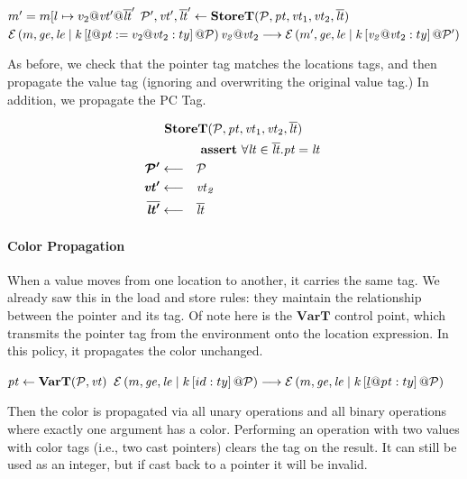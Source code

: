 \documentclass{article}
\begin{document}
                  {\(\mem' = \mem[l \mapsto v_2@\vt' @\overline{\lt}'\)}
                  {\(\trule{\PCT',\vt',\overline{\lt}'}{\storet{\PCT}{\pt}{\vt_1}{\vt_2}{\overline{\lt}}}\)}
                  {\(\defestate
                    {\assign{\loc{l}{\pt}}{v_2@\vt_2}}{ty}{\val{v_2}{\vt_2}}
                    \longrightarrow
                    \estate{\PCT'}{\mem'}{\genv}{\lenv}
                           {\val{v_2}{\vt_2}}{ty}{\cont}\)}

As before, we check that the pointer tag matches the locations tags, and then propagate the
value tag (ignoring and overwriting the original value tag.) In addition, we propagate the PC Tag.
                  
\[\begin{aligned}
\truledef{\storet{\PCT}{\pt}{\vt_1}{\vt_2}{\overline{\lt}}}
\assert{\forall \lt \in \overline{\lt} . \pt = \lt}
\settag{\PCT'}{\PCT}
\settag{\vt'}{\vt_2}
\settag{\overline{\lt'}}{\overline{\lt}}
\end{aligned}\]

\paragraph*{Color Propagation}

When a value moves from one location to another, it carries the same tag.
We already saw this in the load and store rules: they maintain the relationship
between the pointer and its tag. Of note here is the \(\mathbf{VarT}\) control point,
which transmits the pointer tag from the environment onto the location expression.
In this policy, it propagates the color unchanged.

            {\(\trule{\pt}{\vart{\PCT}{\vt}}\)}
            {\(\defestate{\var{id}}{ty}
              \longrightarrow
              \defestate{\loc{l}{\pt}}{ty}\)}


Then the color is propagated via all unary operations and all binary operations
where exactly one argument has a color. Performing an operation with two values
with color tags (i.e., two cast pointers) clears the tag on the result. It can still
be used as an integer, but if cast back to a pointer it will be invalid.
\end{document}
